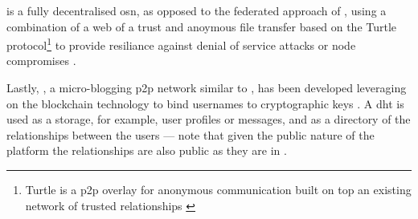 \RetroShare is a fully decentralised \ac{osn}, as opposed to the federated approach 
of \diaspora, using a combination of a web of a trust and anoymous file transfer 
based on the Turtle protocol\footnote{Turtle is a \ac{p2p} overlay for anonymous 
communication built on top an existing network of trusted relationships \cite{PopescuCT04}} 
to provide resiliance against denial of service attacks or node compromises \cite{RetroShare}. 

Lastly, \Twister, a micro-blogging \ac{p2p} network similar to \Twitter, has been 
developed leveraging on the blockchain technology to bind usernames to cryptographic 
keys \cite{Freitas13}. A \ac{dht} is used as a storage, for example, user profiles 
or messages, and as a directory of the relationships between the users --- note 
that given the public nature of the platform the relationships are also public as 
they are in \Twitter.